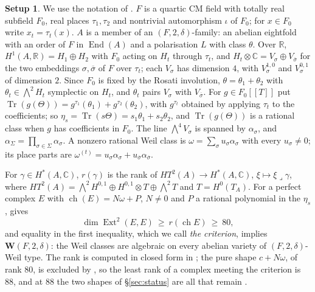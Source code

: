 \documentclass[11pt]{amsart}
\theoremstyle{definition}
\newtheorem{setup}[theorem]{Setup}
\theoremstyle{remark}
\newcommand{\RR}{\mathbb{R}}
\newcommand{\CC}{\mathbb{C}}
\newcommand{\ch}{\operatorname{ch}}
\newcommand{\Ext}{\operatorname{Ext}}
\newcommand{\End}{\operatorname{End}}
\newcommand{\Tr}{\operatorname{Tr}}
\newcommand{\bbar}{\overline}
\newcommand{\lrc}{\lrcorner}
\begin{document}
\begin{setup}\label{setup:quartic}
We use the notation of \cite[\S19]{BMB}. $F$ is a quartic CM field with
totally real subfield $F_{0}$, real places $\tau_{1},\tau_{2}$ and nontrivial
automorphism $\iota$ of $F_{0}$; for $x\in F_{0}$ write $x_{t}=\tau_{t}(x)$.
$A$ is a member of an $(F,2,\delta)$-family: an abelian eightfold with an
order of $F$ in $\End(A)$ and a polarisation $L$ with class $\theta$. Over
$\RR$, $H^{1}(A,\RR)=H_{1}\oplus H_{2}$ with $F_{0}$ acting on $H_{t}$ through
$\tau_{t}$, and $H_{t}\otimes\CC=V_{\sigma}\oplus V_{\bbar\sigma}$ for the
two embeddings $\sigma,\bbar\sigma$ of $F$ over $\tau_{t}$; each $V_{\sigma}$
has dimension $4$, with $V_{\sigma}^{1,0}$ and $V_{\sigma}^{0,1}$ of
dimension $2$. Since $F_{0}$ is fixed by the Rosati involution,
$\theta=\theta_{1}+\theta_{2}$ with $\theta_{t}\in\bigwedge^{2}H_{t}$
symplectic on $H_{t}$, and $\theta_{t}$ pairs $V_{\sigma}$ with
$V_{\bbar\sigma}$. For $g\in F_{0}[[T]]$ put
$\Tr(g(\Theta))=g^{\tau_{1}}(\theta_{1})+g^{\tau_{2}}(\theta_{2})$, with
$g^{\tau_{t}}$ obtained by applying $\tau_{t}$ to the coefficients; so
$\eta_{s}=\Tr(s\Theta)=s_{1}\theta_{1}+s_{2}\theta_{2}$, and
$\Tr(g(\Theta))$ is a rational class when $g$ has coefficients in $F_{0}$.
The line $\bigwedge^{4}V_{\sigma}$ is spanned by $\alpha_{\sigma}$, and
$\alpha_{\Sigma}=\prod_{\sigma\in\Sigma}\alpha_{\sigma}$. A nonzero rational
Weil class is $\omega=\sum_{\sigma}u_{\sigma}\alpha_{\sigma}$ with every
$u_{\sigma}\neq0$; its place parts are
$\omega^{(t)}=u_{\sigma}\alpha_{\sigma}+u_{\bbar\sigma}\alpha_{\bbar\sigma}$.
\end{setup}

For $\gamma\in H^{*}(A,\CC)$, $r(\gamma)$ is the rank of
$HT^{2}(A)\to H^{*}(A,\CC)$, $\xi\mapsto\xi\lrc\gamma$, where
$HT^{2}(A)=\bigwedge^{2}H^{0,1}\oplus H^{0,1}\otimes T\oplus\bigwedge^{2}T$
and $T=H^{0}(T_{A})$. For a perfect complex $E$ with $\ch(E)=N\omega+P$,
$N\neq0$ and $P$ a rational polynomial in the $\eta_{s}$,
\cite[Theorem~19.21(v)]{BMB} gives
\begin{equation}\label{eq:criterion}
  \dim\Ext^{2}(E,E)\ \ge\ r(\ch E)\ \ge\ 80,
\end{equation}
and equality in the first inequality, which we call \emph{the criterion},
implies $\mathbf{W}(F,2,\delta)$: the Weil classes are algebraic on every
abelian variety of $(F,2,\delta)$-Weil type. The rank is computed in closed form in
\cite[Theorem~19.22]{BMB}; the pure shape $c+N\omega$, of rank $80$, is
excluded by \cite[Theorem~19.12]{BMB}, so the least rank of a complex meeting
the criterion is $88$, and at $88$ the two shapes of \S\ref{sec:status} are
all that remain \cite[Proposition~19.24, Corollary~19.26]{BMB}.
\end{document}
